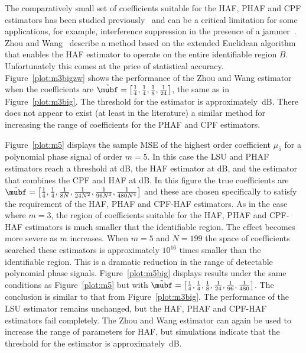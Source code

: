 \documentclass[journal]{IEEEtran}
\begin{document}
The comparatively small set of coefficients suitable for the HAF, PHAF and CPF estimators has been studied previously~\cite{Angeby_PPS_aliasing_2000,Djurovic_aliasing_2012,McKilliam2009IndentifiabliltyAliasingPolyphase,Zhou_lag_diverity_PPT_1997,Xia_dynamic_range_pps_2001,Morelande_bayes_unwrapping_2009_tsp} and can be a critical limitation for some applications, for example, interference suppression in the presence of a jammer~\cite{Djukanovic:2011:PMN:1950994.1951252,Djurovic_aliasing_2012}.  Zhou and Wang~\cite{Zhou_lag_diverity_PPT_1997} describe a method based on the extended Euclidean algorithm that enables the HAF estimator to operate on the entire identifiable region $B$.  Unfortunately this comes at the price of statistical accuracy.  Figure~\ref{plot:m3bigzw} shows the performance of the Zhou and Wang estimator when the coefficients are $\tilde{\mubf} = \left[ \tfrac{1}{4}, \tfrac{1}{4}, \tfrac{1}{8}, \tfrac{1}{24}  \right]$, the same as in Figure~\ref{plot:m3big}.  The threshold for the estimator is approximately~\unit[29]{dB}.  There does not appear to exist (at least in the literature) a similar method for increasing the range of coefficients for the PHAF and CPF estimators.

Figure~\ref{plot:m5} displays the sample MSE of the highest order coefficient $\mu_5$  for a polynomial phase signal of order $m=5$.  In this case the LSU and PHAF estimators reach a threshold at \unit[12]{dB}, the HAF estimator at \unit[18]{dB}, and the estimator that combines the CPF and HAF at \unit[10]{dB}.  In this figure the true coefficients are $\tilde{\mubf} = \left[ \tfrac{1}{4}, \tfrac{1}{4}, \tfrac{1}{8N}, \tfrac{1}{24N^2}, \tfrac{1}{96N^3}, \tfrac{1}{480N^4}  \right]$ and these are chosen specifically to satisfy the requirement of the HAF, PHAF and CPF-HAF estimators.  As in the case where $m=3$, the region of coefficients suitable for the HAF, PHAF and CPF-HAF estimators is much smaller that the identifiable region.  The effect becomes more severe as $m$ increases.  When $m=5$ and $N=199$ the space of coefficients searched these estimators is approximately $10^{16}$ times smaller than the identifiable region.  This is a dramatic reduction in the range of detectable polynomial phase signals. Figure~\ref{plot:m5big} displays results under the same conditions as Figure~\ref{plot:m5} but with $\tilde{\mubf} = \left[ \tfrac{1}{4}, \tfrac{1}{4}, \tfrac{1}{8}, \tfrac{1}{24}, \tfrac{1}{96}, \tfrac{1}{480}  \right]$.  The conclusion is similar to that from Figure~\ref{plot:m3big}.  The performance of the LSU estimator remains unchanged, but the HAF, PHAF and CPF-HAF estimators fail completely.  The Zhou and Wang estimator can again be used to increase the range of parameters for HAF, but simulations indicate that the threshold for the estimator is approximately~\unit[103]{dB}.
\end{document}

